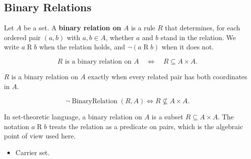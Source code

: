 \subsection{Binary Relations}
\label{subsec:binary-relations}

\begin{tcolorbox}[title={Definition --- Binary Relation}]
\begin{definition}
\label{def:binary-relation}
Let $A$ be a set.
A \textbf{binary relation on $A$} is a rule $R$ that determines, for each
ordered pair $(a,b)$ with $a,b \in A$, whether $a$ and $b$ stand in the
relation.  We write $a \mathrel{R} b$ when the relation holds, and
$\lnot(a \mathrel{R} b)$ when it does not.
\end{definition}
\end{tcolorbox}

\begin{remark*}
\[
R \text{ is a binary relation on } A
\quad\Longleftrightarrow\quad
R\subseteq A\times A.
\]
\end{remark*}

\begin{remark*}
$R$ is a binary relation on $A$ exactly when every related pair has both
coordinates in $A$.
\end{remark*}

\begin{remark*}
\[
\neg\operatorname{BinaryRelation}(R,A)
\Longleftrightarrow
R\not\subseteq A\times A.
\]
\end{remark*}

\begin{remark*}[Interpretation]
In set-theoretic language, a binary relation on $A$ is a subset
$R \subseteq A \times A$.  The notation $a \mathrel{R} b$ treats the relation
as a predicate on pairs, which is the algebraic point of view used here.
\end{remark*}

\begin{remark*}[Dependencies]
\begin{itemize}
  \item Carrier set.
\end{itemize}
\end{remark*}
